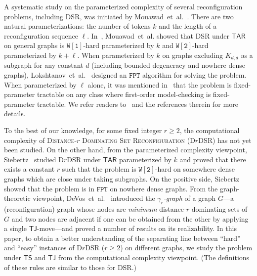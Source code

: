 \documentclass[a4paper]{article}
\theoremstyle{plain}
\theoremstyle{definition}
\newcommand{\sfTS}{{\mathsf{TS}}} %
\newcommand{\sfTJ}{{\mathsf{TJ}}} %
\newcommand{\sfTAR}{{\mathsf{TAR}}} %
\begin{document}
A systematic study on the parameterized complexity of several reconfiguration problems, including \textsc{DSR}, was initiated by Mouawad~et~al.~\cite{MouawadN0SS17}.
There are two natural parameterizations: the number of tokens $k$ and the length of a reconfiguration sequence $\ell$.
In~\cite{MouawadN0SS17}, Mouawad~et~al. showed that \textsc{DSR} under $\sfTAR$ on general graphs is $\mathtt{W[1]}$-hard parameterized by $k$ and $\mathtt{W[2]}$-hard parameterized by $k + \ell$.
When parameterized by $k$ on graphs excluding $K_{d,d}$ as a subgraph for any constant $d$ (including bounded degeneracy and nowhere dense graphs), Lokshtanov~et~al.~\cite{LokshtanovMPRS18} designed an $\mathtt{FPT}$ algorithm for solving the problem.
When parameterized by $\ell$ alone, it was mentioned in~\cite{BousquetMNS22} that the problem is fixed-parameter tractable on any class where first-order model-checking is fixed-parameter tractable.
We refer readers to~\cite{LokshtanovMPRS18,BousquetMNS22} and the references therein for more details.

To the best of our knowledge, for some fixed integer $r \geq 2$, the computational complexity of \textsc{Distance-$r$ Dominating Set Reconfiguration (D$r$DSR)} has not yet been studied.
On the other hand, from the parameterized complexity viewpoint, Siebertz~\cite{Siebertz18} studied \textsc{D$r$DSR} under $\sfTAR$ parameterized by $k$ and proved that there exists a constant $r$ such that the problem is $\mathtt{W[2]}$-hard on somewhere dense graphs which are close under taking subgraphs.
On the positive side, Siebertz showed that the problem is in $\mathtt{FPT}$ on nowhere dense graphs.
From the graph-theoretic viewpoint, DeVos~et~al.~\cite{DeVosDJS20} introduced the \textit{$\gamma_r$-graph} of a graph $G$---a (reconfiguration) graph whose nodes are \textit{minimum} distance-$r$ dominating sets of $G$ and two nodes are adjacent if one can be obtained from the other by applying a single $\sfTJ$-move---and proved a number of results on its realizability.
In this paper, to obtain a better understanding of the separating line between ``hard'' and ``easy'' instances of \textsc{D$r$DSR} ($r \geq 2$) on different graphs, we study the problem under $\sfTS$ and $\sfTJ$ from the computational complexity viewpoint.
(The definitions of these rules are similar to those for \textsc{DSR}.)
\end{document}
